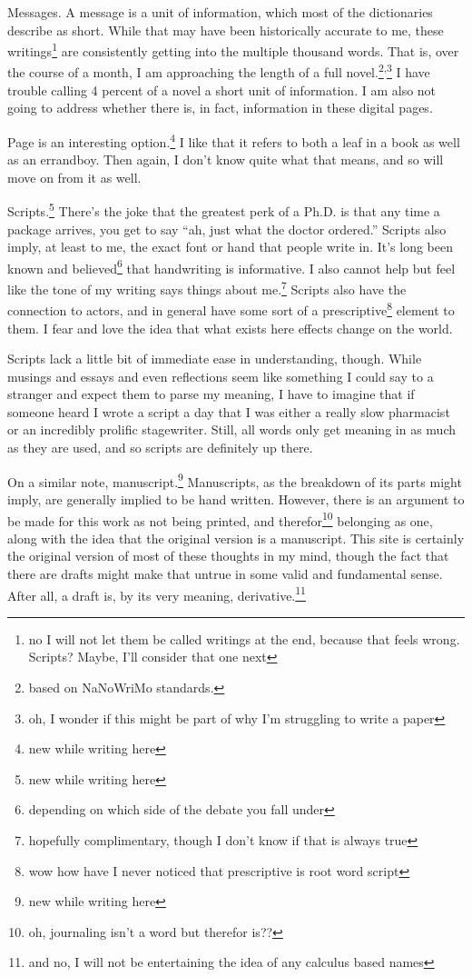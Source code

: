 \documentclass[12pt]{article}
\newcommand{\say}[1]{``#1''}
\renewcommand{\,}{\textsuperscript{,}}
\begin{document}
Messages.  
A message is a unit of information, which most of the dictionaries describe as short.  
While that may have been historically accurate to me, these writings\footnote{no I will not let them be called writings at the end, because that feels wrong. Scripts? Maybe, I'll consider that one next} are consistently getting into the multiple thousand words.  
That is, over the course of a month, I am approaching the length of a full novel.\footnote{based on NaNoWriMo standards.}\,\footnote{oh, I wonder if this might be part of why I'm struggling to write a paper}  
I have trouble calling 4 percent of a novel a short unit of information.  
I am also not going to address whether there is, in fact, information in these digital pages.

Page is an interesting option.\footnote{new while writing here}  
I like that it refers to both a leaf in a book as well as an errandboy.  
Then again, I don't know quite what that means, and so will move on from it as well.

Scripts.\footnote{new while writing here}  
There's the joke that the greatest perk of a Ph.D. is that any time a package arrives, you get to say \say{ah, just what the doctor ordered.}  
Scripts also imply, at least to me, the exact font or hand that people write in.  
It's long been known and believed\footnote{depending on which side of the debate you fall under} that handwriting is informative.  
I also cannot help but feel like the tone of my writing says things about me.\footnote{hopefully complimentary, though I don't know if that is always true}  
Scripts also have the connection to actors, and in general have some sort of a prescriptive\footnote{wow how have I never noticed that prescriptive is root word script} element to them.  
I fear and love the idea that what exists here effects change on the world.

Scripts lack a little bit of immediate ease in understanding, though.  
While musings and essays and even reflections seem like something I could say to a stranger and expect them to parse my meaning, I have to imagine that if someone heard I wrote a script a day that I was either a really slow pharmacist or an incredibly prolific stagewriter.  
Still, all words only get meaning in as much as they are used, and so scripts are definitely up there.

On a similar note, manuscript.\footnote{new while writing here}  
Manuscripts, as the breakdown of its parts might imply, are generally implied to be hand written.  
However, there is an argument to be made for this work as not being printed, and therefor\footnote{oh, journaling isn't a word but therefor is??} belonging as one, along with the idea that the original version is a manuscript.  
This site is certainly the original version of most of these thoughts in my mind, though the fact that there are drafts might make that untrue in some valid and fundamental sense.  
After all, a draft is, by its very meaning, derivative.\footnote{and no, I will not be entertaining the idea of any calculus based names}
\end{document}
